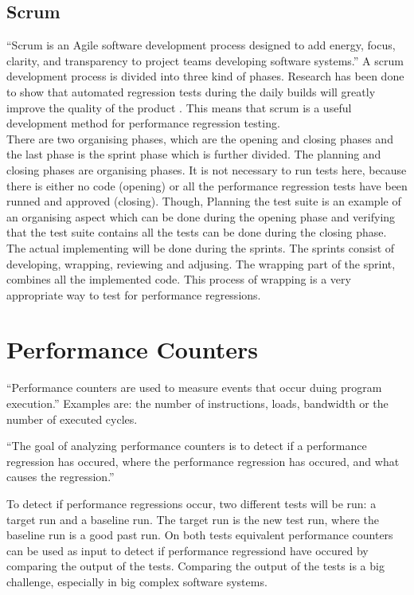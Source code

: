 \subsection{Scrum} 
``Scrum is an Agile software development process designed to add energy, focus, clarity, and transparency to project teams developing software systems.''\cite{sutherland2007distributed} A scrum development process is divided into three kind of phases. Research has been done to show that automated regression tests during the daily builds will greatly improve the quality of the product \cite{Future_of_Scrum}. This means that scrum is a useful development method for performance regression testing. \\ There are two organising phases, which are the opening and closing phases and the last phase is the sprint phase which is further divided. The planning and closing phases are organising phases. It is not necessary to run tests here, because there is either no code (opening) or all the performance regression tests have been runned and approved (closing). Though, Planning the test suite is an example of an organising aspect which can be done during the opening phase and verifying that the test suite contains all the tests can be done during the closing phase. \\ The actual implementing will be done during the sprints. The sprints consist of developing, wrapping, reviewing and adjusing. The wrapping part of the sprint, combines all the implemented code. This process of wrapping is a very appropriate way to test for performance regressions.

\section{Performance Counters}``Performance counters are used to measure events that occur duing program execution.''\cite{PC} Examples are: the number of instructions, loads, bandwidth or the number of executed cycles.

``The goal of analyzing performance counters is to detect if a performance regression has occured, where the performance regression has occured, and what causes the regression.'' \cite{nguyen2012using}

To detect if performance regressions occur, two different tests will be run: a target run and a baseline run. The target run is the new test run, where the baseline run is a good past run. On both tests equivalent performance counters can be used as input to detect if performance regressiond have occured by comparing the output of the tests. Comparing the output of the tests is a big challenge, especially in big complex software systems.

